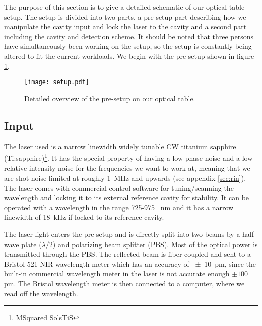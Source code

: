 The purpose of this section is to give a detailed schematic of our optical table setup. The setup is divided into two parts, a pre-setup part describing how we manipulate the cavity input and lock the laser to the cavity and a second part including the cavity and detection scheme. It should be noted that three persons have simultaneously been working on the setup, so the setup is constantly being altered to fit the current workloads. We begin with the pre-setup shown in figure \ref{fig:presetup}.

\begin{figure}[H]
\centering
\texttt{[image: setup.pdf]}
\caption{Detailed overview of the pre-setup on our optical table.}
\label{fig:presetup}
\end{figure}

\subsection{Input}
The laser used is a narrow linewidth widely tunable CW titanium sapphire (Ti:sapphire)\footnote{MSquared SolsTiS}. It has the special property of having a low phase noise and a low relative intensity noise for the frequencies we want to work at, meaning that we are shot noise limited at roughly \SI{1}{\mega\hertz} and upwards (see appendix \ref{sec:rin}). The laser comes with commercial control software for tuning/scanning the wavelength and locking it to its external reference cavity for stability. It can be operated with a wavelength in the range 725-975 \SI{}{\nano\meter} and it has a narrow linewidth of \SI{18}{\kilo\hertz} if locked to its reference cavity.

The laser light enters the pre-setup and is directly split into two beams by a half wave plate ($\lambda/2$) and polarizing beam splitter (PBS). Most of the optical power is transmitted through the PBS. The reflected beam is fiber coupled and sent to a Bristol 521-NIR wavelength meter which has an accuracy of \SI{\pm 10}{pm}, since the built-in commercial wavelength meter in the laser is not accurate enough $\pm 100$ pm. The Bristol wavelength meter is then connected to a computer, where we read off the wavelength.

